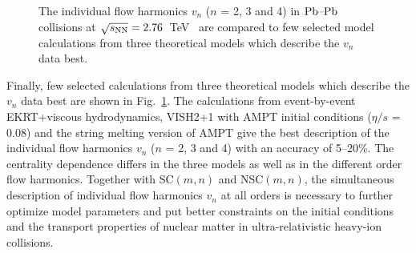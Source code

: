 \begin{figure}[h]
\begin{center}
        \caption{The individual flow harmonics $v_n$ ($n$ = 2, 3 and 4) in $\textnormal{Pb--Pb}$ collisions at $\sqrt{s_{\textnormal{NN}}}=2.76$~TeV~\cite{Adam:2016izf} are compared to few selected model calculations from three theoretical models which describe the $v_n$ data best.}
        \label{fig:Figure_A4}
              \end{center}
\end{figure}

Finally, few selected calculations from three theoretical models which describe the $v_n$ data best are shown in Fig.~\ref{fig:Figure_A4}.
The calculations from event-by-event EKRT+viscous hydrodynamics, VISH2+1 with AMPT initial conditions ($\eta/s$ = 0.08) and the string melting version of AMPT give the best description of the individual flow harmonics $v_n$ ($n$ = 2, 3 and 4) with an accuracy of 5--20\%. The centrality dependence differs in the three models as well as in the different order flow harmonics.
Together with SC$(m,n)$ and NSC$(m,n)$, the simultaneous description of individual flow harmonics $v_n$ at all orders is necessary to further optimize model parameters and put better constraints on the initial conditions and the transport properties of nuclear matter in ultra-relativistic heavy-ion collisions.

